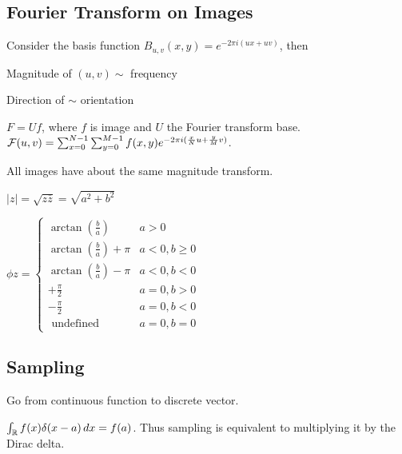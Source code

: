\subsection{Fourier Transform on Images}

Consider the basis function \(B_{u,v}(x, y) = e^{-2\pi i(ux + uv)}\), then

\begin{itemize*}
  \item Magnitude of \((u, v) \sim\) frequency
  \item Direction of \(\sim\) orientation
\end{itemize*}

\begin{definition}[FT on Images]
 \(F = Uf\), where \(f\) is image and \(U\) the Fourier transform base.
 \(\operatorname{\mathcal{F}}(u,v) = \sum_{x = 0}^{N - 1}\sum_{y = 0}^{M - 1} f(x, y) e^{-2\pi i (\frac{x}{N}u + \frac{y}{M}v)}\).
\end{definition}

\begin{theorem}
  All images have about the same magnitude transform.
\end{theorem}

\begin{definition}[Magnitude of \(z \in \C\)]
  \(|z| = \sqrt{z \overline{z}} = \sqrt{a^2 + b^2}\)
\end{definition}

\begin{definition}[Phase of \(z \in \C\)]
  \(\phi{z} =\left\{\begin{array}{ll}\arctan \left(\frac{b}{a}\right) & a>0 \\ \arctan \left(\frac{b}{a}\right)+\pi & a<0, b \geq 0 \\ \arctan \left(\frac{b}{a}\right)-\pi & a<0, b<0 \\ +\frac{\pi}{2} & a=0, b>0 \\ -\frac{\pi}{2} & a=0, b<0 \\ \text { undefined } & a=0, b=0\end{array}\right.\)
\end{definition}

\subsection{Sampling}
Go from continuous function to discrete vector.

\begin{definition}
  \(\int_{\operatorname{\mathbb{R}}}f(x)\delta(x - a) \,dx = f(a)\). Thus sampling is equivalent to multiplying it by the Dirac delta.
\end{definition}

